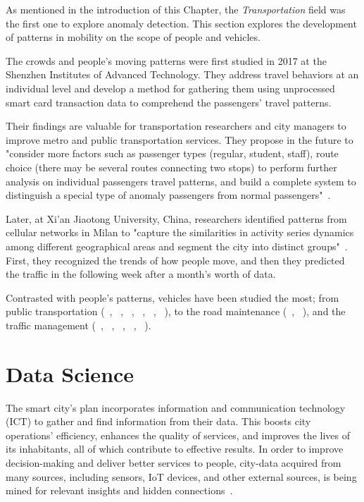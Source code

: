\documentclass[a4paper,12pt,twoside]{ThesisStyle}
\begin{document}
As mentioned in the introduction of this Chapter, the \textit{Transportation} field was the first one to explore anomaly detection. This section explores the development of patterns in mobility on the scope of people and vehicles.

The crowds and people's moving patterns were first studied in 2017 at the Shenzhen Institutes of Advanced Technology. They address travel behaviors at an individual level and develop a method for gathering them using unprocessed smart card transaction data to comprehend the passengers' travel patterns. 

Their findings are valuable for transportation researchers and city managers to improve metro and public transportation services. They propose in the future to "consider more factors such as passenger types (regular, student, staff), route choice (there may be several routes connecting two stops) to perform further analysis on individual passengers travel patterns, and build a complete system to distinguish a special type of anomaly passengers from normal passengers"~\cite{Zhao2017passenger}.

Later, at Xi’an Jiaotong University, China, researchers identified patterns from cellular networks in Milan to "capture the similarities in activity series dynamics among different geographical areas and segment the city into distinct groups"~\cite{Zhu2020cellular}. First, they recognized the trends of how people move, and then they predicted the traffic in the following week after a month's worth of data.

Contrasted with people's patterns, vehicles have been studied the most; from public transportation (~\cite{Wang2017Taxis}, ~\cite{killeen2019iot}, ~\cite{zantalis2019review}, ~\cite{bangui2021hybrid}, ~\cite{Wang2021CAN}, ~\cite{wu2023gtfs}), to the road maintenance (~\cite{Nugraha2021rail}, ~\cite{kyriakou2021vehicles}), and the traffic management (~\cite{Bawaneh2019traffic}, ~\cite{mondal2020road}, ~\cite{belhadi2020space}, ~\cite{gomari2021cluster}, ~\cite{bachechi2022big}).

\section{Data Science}
\label{subcap:datascience}

The smart city's plan incorporates information and communication technology (ICT) to gather and find information from their data. This boosts city operations' efficiency, enhances the quality of services, and improves the lives of its inhabitants, all of which contribute to effective results. In order to improve  decision-making and deliver better services to people, city-data acquired from many sources, including sensors, IoT devices, and other external sources, is being mined for relevant insights and hidden connections~\cite{SmartCitiesDataScience2022}. 
\end{document}
